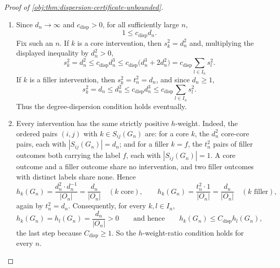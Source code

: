 \begin{proof}[Proof of \cref{obj:thm:dispersion-certificate-unbounded}]
\begin{enumerate}
\item Since \(d_n\to\infty\) and \(c_{\mathrm{disp}}>0\), for all
sufficiently large \(n\),
\[
1\leq c_{\mathrm{disp}}d_n .
\]
Fix such an \(n\).  If \(k\) is a core intervention, then \(s_k^2=d_n^2\) and, multiplying the displayed inequality by \(d_n^2>0\),
\[
s_k^2=d_n^2
 \leq c_{\mathrm{disp}}d_n^3
 \leq c_{\mathrm{disp}}
 \bigl(d_n^3+2d_n^2\bigr)
 =c_{\mathrm{disp}}\sum_{l\in I_n}s_l^2 .
\]
If \(k\) is a filler intervention, then \(s_k^2=t_n^2=d_n\), and since \(d_n\geq1\),
\[
s_k^2=d_n\leq d_n^2\leq c_{\mathrm{disp}}d_n^3
 \leq c_{\mathrm{disp}}\sum_{l\in I_n}s_l^2 .
\]
Thus the degree-dispersion condition holds eventually.

\item Every intervention has the same strictly positive \(h\)-weight.  Indeed, the ordered pairs \((i,j)\) with \(k\in S_{ij}(G_n)\) are: for a core \(k\), the \(d_n^2\) core-core pairs, each with \(|S_{ij}(G_n)|=d_n\); and for a filler \(k=f\), the \(t_n^2\) pairs of filler outcomes both carrying the label \(f\), each with \(|S_{ij}(G_n)|=1\).  A core outcome and a filler outcome share no intervention, and two filler outcomes with distinct labels share none.  Hence
\[
h_k(G_n)=\frac{d_n^2\cdot d_n^{-1}}{|O_n|}=\frac{d_n}{|O_n|}
\quad(k\text{ core}),
\qquad
h_k(G_n)=\frac{t_n^2\cdot1}{|O_n|}=\frac{d_n}{|O_n|}
\quad(k\text{ filler}),
\]
again by \(t_n^2=d_n\).  Consequently, for every \(k,l\in I_n\),
\[
h_k(G_n)=h_l(G_n)=\frac{d_n}{|O_n|}>0
\qquad\text{and hence}\qquad
h_k(G_n)\leq C_{\mathrm{disp}}h_l(G_n),
\]
the last step because \(C_{\mathrm{disp}}\geq1\).  So the \(h\)-weight-ratio condition holds for every \(n\).


\end{enumerate}
\end{proof}
